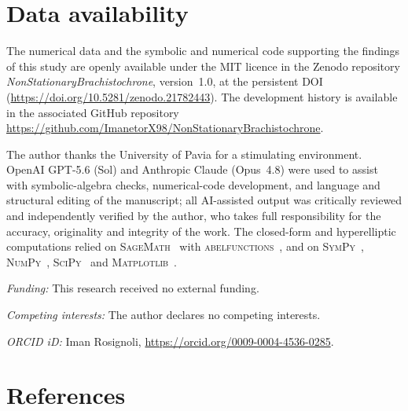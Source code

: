 \documentclass[12pt]{iopart}
\begin{document}
\FloatBarrier


\section*{Data availability}
The numerical data and the symbolic and numerical code supporting the findings of this
study are openly available under the MIT licence in the Zenodo repository
\emph{NonStationaryBrachistochrone}, version~1.0, at the persistent
DOI~\cite{Rosignoli2026Code} (\url{https://doi.org/10.5281/zenodo.21782443}). The
development history is available in the associated GitHub repository
\url{https://github.com/ImanetorX98/NonStationaryBrachistochrone}.

\ack
The author thanks the University of Pavia for a stimulating environment. OpenAI
GPT-5.6 (Sol) and Anthropic Claude (Opus~4.8) were used to assist with symbolic-algebra
checks, numerical-code development, and language and structural editing of the manuscript;
all AI-assisted output was critically reviewed and independently verified by the author,
who takes full responsibility for the accuracy, originality and integrity of the work. The
closed-form and hyperelliptic computations relied on \textsc{SageMath}~\cite{SageMath}
with \textsc{abelfunctions}~\cite{abelfunctions}, and on
\textsc{SymPy}~\cite{SymPy}, \textsc{NumPy}~\cite{NumPy}, \textsc{SciPy}~\cite{SciPy} and
\textsc{Matplotlib}~\cite{Matplotlib}.

\medskip\noindent\textit{Funding:} This research received no external funding.

\medskip\noindent\textit{Competing interests:} The author declares no competing interests.

\medskip\noindent\textit{ORCID iD:} Iman Rosignoli,
\url{https://orcid.org/0009-0004-4536-0285}.

\section*{References}


\end{document}
